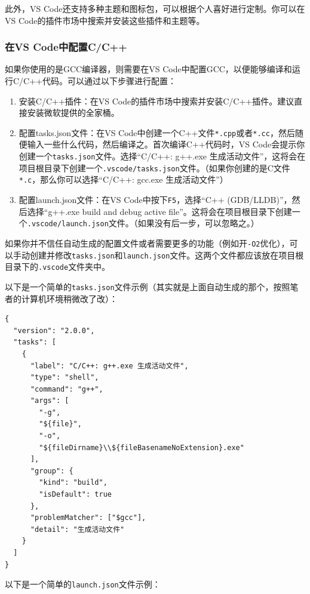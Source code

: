 \documentclass[../main.tex]{subfiles}
\begin{document}
此外，VS Code还支持多种主题和图标包，可以根据个人喜好进行定制。你可以在VS Code的插件市场中搜索并安装这些插件和主题等。

\subsubsection{在VS Code中配置C/C++}\label{sec:configure-cpp}

如果你使用的是GCC编译器，则需要在VS Code中配置GCC，以便能够编译和运行C/C++代码。可以通过以下步骤进行配置：

\begin{enumerate}
  \item 安装C/C++插件：在VS Code的插件市场中搜索并安装C/C++插件。建议直接安装微软提供的全家桶。
  \item 配置tasks.json文件：在VS Code中创建一个C++文件\texttt{*.cpp}或者\texttt{*.cc}，然后随便输入一些什么代码，然后编译之。首次编译C++代码时，VS Code会提示你创建一个\texttt{tasks.json}文件。选择“C/C++: g++.exe 生成活动文件”，这将会在项目根目录下创建一个\texttt{.vscode/tasks.json}文件。（如果你创建的是C文件\texttt{*.c}，那么你可以选择“C/C++: gcc.exe 生成活动文件”）
  \item 配置launch.json文件：在VS Code中按下\texttt{F5}，选择“C++ (GDB/LLDB)”，然后选择“g++.exe build and debug active file”。这将会在项目根目录下创建一个\texttt{.vscode/launch.json}文件。（如果没有后一步，可以忽略之。）
\end{enumerate}

如果你并不信任自动生成的配置文件或者需要更多的功能（例如开\texttt{-O2}优化），可以手动创建并修改\texttt{tasks.json}和\texttt{launch.json}文件。这两个文件都应该放在项目根目录下的\texttt{.vscode}文件夹中。

以下是一个简单的\texttt{tasks.json}文件示例（其实就是上面自动生成的那个，按照笔者的计算机环境稍微改了改）：

\begin{verbatim}
{
  "version": "2.0.0",
  "tasks": [
    {
      "label": "C/C++: g++.exe 生成活动文件",
      "type": "shell",
      "command": "g++",
      "args": [
        "-g",
        "${file}",
        "-o",
        "${fileDirname}\\${fileBasenameNoExtension}.exe"
      ],
      "group": {
        "kind": "build",
        "isDefault": true
      },
      "problemMatcher": ["$gcc"],
      "detail": "生成活动文件"
    }
  ]
}
\end{verbatim}

以下是一个简单的\texttt{launch.json}文件示例：
\end{document}
